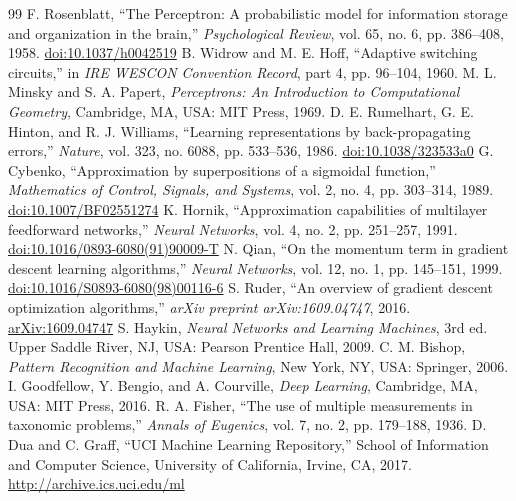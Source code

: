 \documentclass[11pt,letterpaper]{article}
\begin{document}
\begingroup
\renewcommand{\section}[2]{}%
\begin{thebibliography}{99}
     F. Rosenblatt, ``The Perceptron: A probabilistic model for information storage and organization in the brain,'' \textit{Psychological Review}, vol. 65, no. 6, pp. 386--408, 1958. \href{https://doi.org/10.1037/h0042519}{doi:10.1037/h0042519}
     B. Widrow and M. E. Hoff, ``Adaptive switching circuits,'' in \textit{IRE WESCON Convention Record}, part 4, pp. 96--104, 1960.
     M. L. Minsky and S. A. Papert, \textit{Perceptrons: An Introduction to Computational Geometry}, Cambridge, MA, USA: MIT Press, 1969.
     D. E. Rumelhart, G. E. Hinton, and R. J. Williams, ``Learning representations by back-propagating errors,'' \textit{Nature}, vol. 323, no. 6088, pp. 533--536, 1986. \href{https://doi.org/10.1038/323533a0}{doi:10.1038/323533a0}
     G. Cybenko, ``Approximation by superpositions of a sigmoidal function,'' \textit{Mathematics of Control, Signals, and Systems}, vol. 2, no. 4, pp. 303--314, 1989. \href{https://doi.org/10.1007/BF02551274}{doi:10.1007/BF02551274}
     K. Hornik, ``Approximation capabilities of multilayer feedforward networks,'' \textit{Neural Networks}, vol. 4, no. 2, pp. 251--257, 1991. \href{https://doi.org/10.1016/0893-6080(91)90009-T}{doi:10.1016/0893-6080(91)90009-T}
     N. Qian, ``On the momentum term in gradient descent learning algorithms,'' \textit{Neural Networks}, vol. 12, no. 1, pp. 145--151, 1999. \href{https://doi.org/10.1016/S0893-6080(98)00116-6}{doi:10.1016/S0893-6080(98)00116-6}
     S. Ruder, ``An overview of gradient descent optimization algorithms,'' \textit{arXiv preprint arXiv:1609.04747}, 2016. \href{https://arxiv.org/abs/1609.04747}{arXiv:1609.04747}
     S. Haykin, \textit{Neural Networks and Learning Machines}, 3rd ed. Upper Saddle River, NJ, USA: Pearson Prentice Hall, 2009.
     C. M. Bishop, \textit{Pattern Recognition and Machine Learning}, New York, NY, USA: Springer, 2006.
     I. Goodfellow, Y. Bengio, and A. Courville, \textit{Deep Learning}, Cambridge, MA, USA: MIT Press, 2016.
     R. A. Fisher, ``The use of multiple measurements in taxonomic problems,'' \textit{Annals of Eugenics}, vol. 7, no. 2, pp. 179--188, 1936.
     D. Dua and C. Graff, ``UCI Machine Learning Repository,'' School of Information and Computer Science, University of California, Irvine, CA, 2017. \url{http://archive.ics.uci.edu/ml}
\end{thebibliography}
\endgroup
\end{document}
